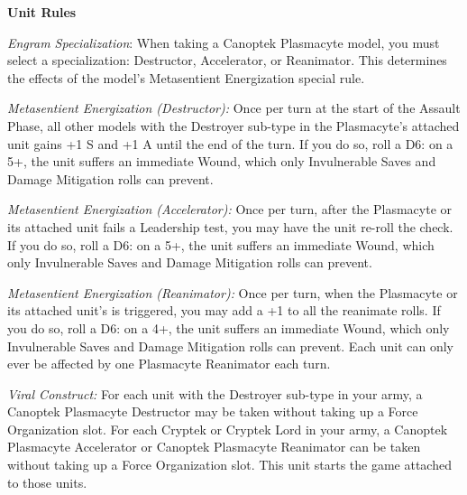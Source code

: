 \begin{minipage}[t]{0.72\textwidth}
	\vspace*{2em}
	\textbf{Unit Rules}
	
	\textit{Engram Specialization}: When taking a Canoptek Plasmacyte model, you must select a specialization: Destructor, Accelerator, or Reanimator. This determines the effects of the model's Metasentient Energization special rule. 
	
	\textit{Metasentient Energization (Destructor):} Once per turn at the start of the Assault Phase, all other models with the Destroyer sub-type in the Plasmacyte's attached unit gains +1 S and +1 A until the end of the turn. If you do so, roll a D6: on a 5+, the unit suffers an immediate Wound, which only Invulnerable Saves and Damage Mitigation rolls can prevent.
	
	\textit{Metasentient Energization (Accelerator):} Once per turn, after the Plasmacyte or its attached unit fails a Leadership test, you may have the unit re-roll the check. If you do so, roll a D6: on a 5+, the unit suffers an immediate Wound, which only Invulnerable Saves and Damage Mitigation rolls can prevent.
	
	\textit{Metasentient Energization (Reanimator):} Once per turn, when the Plasmacyte or its attached unit's  is triggered, you may add a +1 to all the reanimate rolls. If you do so, roll a D6: on a 4+, the unit suffers an immediate Wound, which only Invulnerable Saves and Damage Mitigation rolls can prevent. Each unit can only ever be affected by one Plasmacyte Reanimator each turn.
	
	\textit{Viral Construct:} For each unit with the Destroyer sub-type in your army, a Canoptek Plasmacyte Destructor may be taken without taking up a Force Organization slot. For each Cryptek or Cryptek Lord in your army, a Canoptek Plasmacyte Accelerator or Canoptek Plasmacyte Reanimator can be taken without taking up a Force Organization slot. This unit starts the game attached to those units. 
\end{minipage}
\hspace{0.5em}


\newpage
\subsubsection[Canoptek Reanimator]{}

